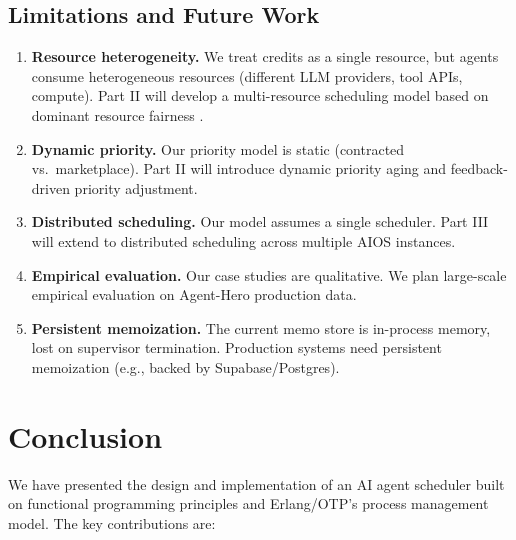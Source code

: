 \documentclass[12pt,a4paper]{article}
\theoremstyle{definition}
\theoremstyle{remark}
\begin{document}
\subsection{Limitations and Future Work}

\begin{enumerate}[leftmargin=2em]
  \item \textbf{Resource heterogeneity.} We treat credits as a single resource, but agents consume heterogeneous resources (different LLM providers, tool APIs, compute). Part II will develop a multi-resource scheduling model based on dominant resource fairness \citep{ghodsi2011dominant}.
  \item \textbf{Dynamic priority.} Our priority model is static (contracted vs.\ marketplace). Part II will introduce dynamic priority aging and feedback-driven priority adjustment.
  \item \textbf{Distributed scheduling.} Our model assumes a single scheduler. Part III will extend to distributed scheduling across multiple AIOS instances.
  \item \textbf{Empirical evaluation.} Our case studies are qualitative. We plan large-scale empirical evaluation on Agent-Hero production data.
  \item \textbf{Persistent memoization.} The current memo store is in-process memory, lost on supervisor termination. Production systems need persistent memoization (e.g., backed by Supabase/Postgres).
\end{enumerate}

\section{Conclusion}\label{sec:conclusion}

We have presented the design and implementation of an AI agent scheduler built on functional programming principles and Erlang/OTP's process management model. The key contributions are:
\end{document}

